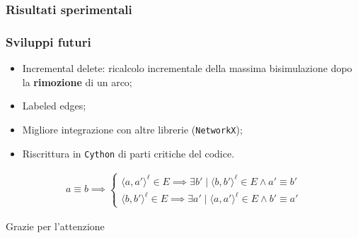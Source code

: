 \documentclass{beamer}
\begin{document}
\begin{frame}
    \frametitle{Risultati sperimentali}
\end{frame}

\begin{frame}
    \frametitle{Sviluppi futuri}
    \begin{itemize}
        \item Incremental delete: ricalcolo incrementale della massima bisimulazione dopo la \textbf{rimozione} di un arco;
        \item Labeled edges;
        \item Migliore integrazione con altre librerie (\texttt{NetworkX});
        \item Riscrittura in \texttt{Cython} di parti critiche del codice.
    \end{itemize}

    \begin{gather*}
        a \equiv b \implies
        \begin{cases}
            \langle a, a' \rangle^\ell \in E \implies \exists b' \mid \langle b, b' \rangle^\ell \in E \land a' \equiv b'\\
            \langle b, b' \rangle^\ell \in E \implies \exists a' \mid \langle a, a' \rangle^\ell \in E \land b' \equiv a'
        \end{cases}
    \end{gather*}
\end{frame}

\begin{frame}
    Grazie per l'attenzione
\end{frame}
\end{document}
